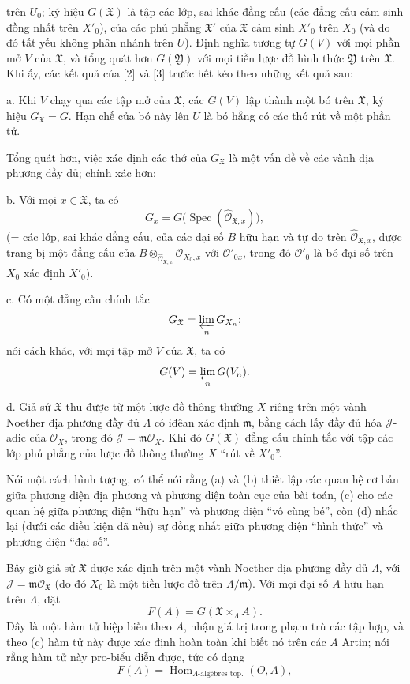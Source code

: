 trên $U_0$; ký hiệu $G(\mathfrak X)$ là tập các lớp, sai khác đẳng cấu (các
đẳng cấu cảm sinh đồng nhất trên $X'_0$), của các phủ phẳng $\mathfrak X'$ của
$\mathfrak X$ cảm sinh $X'_0$ trên $X_0$ (và do đó tất yếu không phân nhánh
trên $U$). Định nghĩa tương tự $G(V)$ với mọi phần mở $V$ của $\mathfrak X$,
và tổng quát hơn $G(\mathfrak Y)$ với mọi tiền lược đồ hình thức
$\mathfrak Y$ trên $\mathfrak X$. Khi ấy, các kết quả của [2] và [3] trước hết
kéo theo những kết quả sau:

\noindent a. Khi $V$ chạy qua các tập mở của $\mathfrak X$, các $G(V)$ lập
thành một bó trên $\mathfrak X$, ký hiệu $G_{\mathfrak X}=G$. Hạn chế của bó
này lên $U$ là bó hằng có các thớ rút về một phần tử.

Tổng quát hơn, việc xác định các thớ của $G_{\mathfrak X}$ là một vấn đề về
các vành địa phương đầy đủ; chính xác hơn:

\noindent b. Với mọi $x\in\mathfrak X$, ta có
\[
  G_x=G\bigl(\operatorname{Spec}(\widehat{\mathcal O}_{\mathfrak X,x})\bigr),
\]
(= các lớp, sai khác đẳng cấu, của các đại số $B$ hữu hạn và tự do trên
$\widehat{\mathcal O}_{\mathfrak X,x}$, được trang bị một đẳng cấu của
$B\otimes_{\widehat{\mathcal O}_{\mathfrak X,x}}\mathcal O_{X_0,x}$ với
$\mathcal O'_{0x}$, trong đó $\mathcal O'_0$ là bó đại số trên $X_0$ xác định
$X'_0$).

\noindent c. Có một đẳng cấu chính tắc
\[
  G_{\mathfrak X}=\varprojlim_nG_{X_n} ;
\]
nói cách khác, với mọi tập mở $V$ của $\mathfrak X$, ta có
\[
  G(V)=\varprojlim_nG(V_n).
\]

\noindent d. Giả sử $\mathfrak X$ thu được từ một lược đồ thông thường $X$
riêng trên một vành Noether địa phương đầy đủ $\Lambda$ có iđêan xác định
$\mathfrak m$, bằng cách lấy đầy đủ hóa $\mathcal J$-adic của $\mathcal O_X$,
trong đó $\mathcal J=\mathfrak m\mathcal O_X$. Khi đó $G(\mathfrak X)$ đẳng
cấu chính tắc với tập các lớp phủ phẳng của lược đồ thông thường $X$ ``rút về
$X'_0$''.

Nói một cách hình tượng, có thể nói rằng (a) và (b) thiết lập các quan hệ cơ
bản giữa phương diện địa phương và phương diện toàn cục của bài toán, (c) cho
các quan hệ giữa phương diện ``hữu hạn'' và phương diện ``vô cùng bé'', còn
(d) nhắc lại (dưới các điều kiện đã nêu) sự đồng nhất giữa phương diện ``hình
thức'' và phương diện ``đại số''.

Bây giờ giả sử $\mathfrak X$ được xác định trên một vành Noether địa phương
đầy đủ $\Lambda$, với $\mathcal J=\mathfrak m\mathcal O_{\mathfrak X}$ (do đó
$X_0$ là một tiền lược đồ trên $\Lambda/\mathfrak m$). Với mọi đại số $A$ hữu
hạn trên $\Lambda$, đặt
\[
  F(A)=G(\mathfrak X\times_\Lambda A).
\]
Đây là một hàm tử hiệp biến theo $A$, nhận giá trị trong phạm trù các tập hợp,
và theo (c) hàm tử này được xác định hoàn toàn khi biết nó trên các $A$ Artin;
nói rằng hàm tử này pro-biểu diễn được, tức có dạng
\[
  F(A)=\operatorname{Hom}_{\Lambda\text{-algèbres top.}}(O,A),
\]

